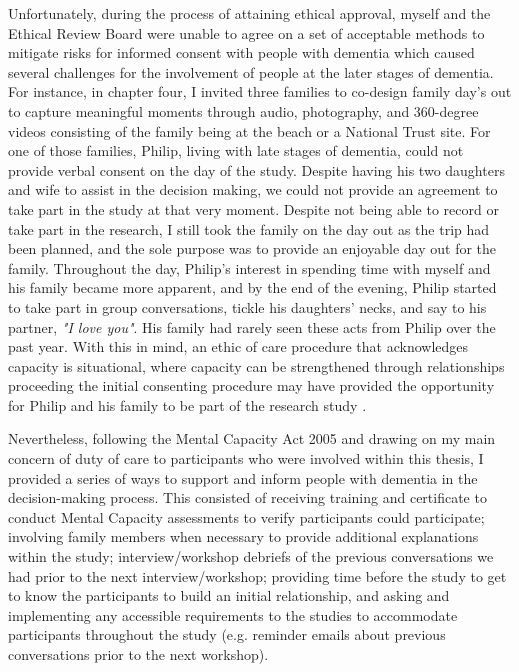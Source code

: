 Unfortunately, during the process of attaining ethical approval, myself and the Ethical Review Board were unable to agree on a set of acceptable methods to mitigate risks for informed consent with people with dementia which caused several challenges for the involvement of people at the later stages of dementia. For instance, in chapter four, I invited three families to co-design family day's out to capture meaningful moments through audio, photography, and 360-degree videos consisting of the family being at the beach or a National Trust site. For one of those families, Philip, living with late stages of dementia, could not provide verbal consent on the day of the study. Despite having his two daughters and wife to assist in the decision making, we could not provide an agreement to take part in the study at that very moment. 
Despite not being able to record or take part in the research, I still took the family on the day out as the trip had been planned, and the sole purpose was to provide an enjoyable day out for the family. Throughout the day, Philip's interest in spending time with myself and his family became more apparent, and by the end of the evening, Philip started to take part in group conversations, tickle his daughters' necks, and say to his partner, \textit{"I love you"}. His family had rarely seen these acts from Philip over the past year. With this in mind, an ethic of care procedure that acknowledges capacity is situational, where capacity can be strengthened through relationships proceeding the initial consenting procedure may have provided the opportunity for Philip and his family to be part of the research study \citep{lloyd2004mortality}.

Nevertheless, following the Mental Capacity Act 2005 \citep{oyebode_mental_2005} and drawing on my main concern of duty of care to participants who were involved within this thesis, I provided a series of ways to support and inform people with dementia in the decision-making process. This consisted of receiving training and certificate to conduct Mental Capacity assessments to verify participants could participate; involving family members when necessary to provide additional explanations within the study; interview/workshop debriefs of the previous conversations we had prior to the next interview/workshop; providing time before the study to get to know the participants to build an initial relationship, and asking and implementing any accessible requirements to the studies to accommodate participants throughout the study (e.g. reminder emails about previous conversations prior to the next workshop). 

